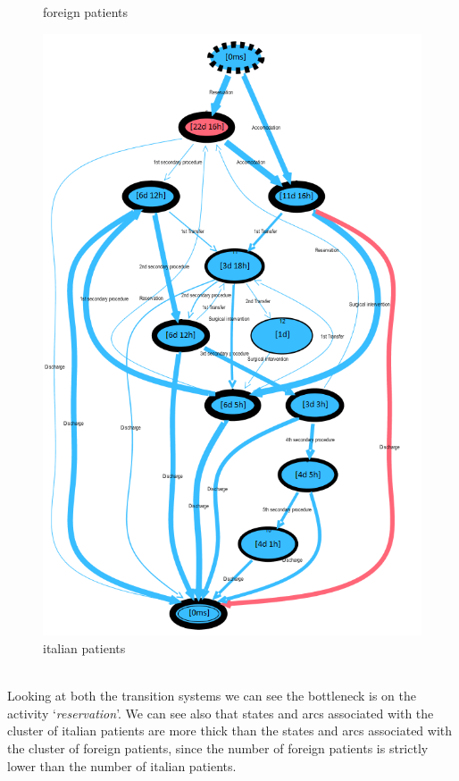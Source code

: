 \begin{figure} [htbp]
\begin{minipage}[t]{0.38\textwidth}
\caption{foreign patients}
\end{minipage}
\begin{minipage}[t]{0.60\textwidth}
\includegraphics[width=\textwidth]{RicoveriTransitionSystemSojournItalians}
\caption{italian patients}
\end{minipage}
\end{figure}\\
Looking at both the transition systems we can see the bottleneck is on the activity `\textit{reservation}'. We can see also that states and arcs associated with the cluster of italian patients are more thick than the states and arcs associated with the cluster of foreign patients, since the number of foreign patients is strictly lower than the number of italian patients.

